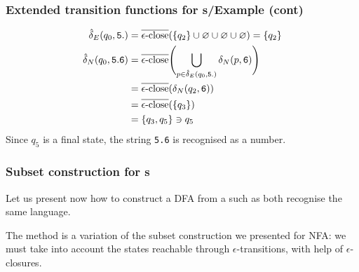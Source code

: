 %
\begin{frame}[containsverbatim]
\frametitle{Extended transition functions for {\eNFA}s/Example (cont)}

\begin{align*}
   \hat{\delta}_E (q_0, \mathtt{5.})
&= \overline{\epsilon\text{-close}} (\{q_2\} \cup \varnothing \cup \varnothing \cup
   \varnothing)
 = \{q_2\}\\
   \hat{\delta}_N (q_0, \mathtt{5.6})
&= \overline{\epsilon\text{-close}} \Biggl( \bigcup_{p \in \hat{\delta}_E (q_0,
     \mathtt{5.})}{\delta_N (p, \mathtt{6})} \Biggr)\\
&= \overline{\epsilon\text{-close}} (\delta_N (q_2, \mathtt{6}))\\
&= \overline{\epsilon\text{-close}} (\{q_3\})\\
&= \{q_3, q_5\} \ni q_5
\end{align*}
Since \(q_5\) is a final state, the string \verb+5.6+ is recognised as
a number.

\end{frame}

%
\begin{frame}
\frametitle{Subset construction for {\eNFA}s}

Let us present now how to construct a DFA from a \eNFA such as both
recognise the same language.

\bigskip

The method is a variation of the subset construction we presented for
NFA: we must take into account the states reachable through
\(\epsilon\)-transitions, with help of \(\epsilon\)-closures.

\end{frame}

